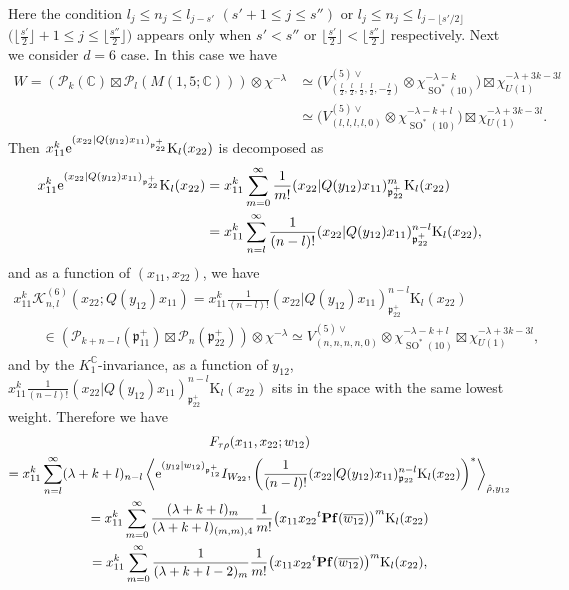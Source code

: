 \documentclass[pdftex]{sigma}
\numberwithin{equation}{section}
\newcommand{\BC}{\mathbb{C}}
\newcommand{\fp}{\mathfrak{p}}
\newcommand{\cK}{\mathcal{K}}
\newcommand{\cP}{\mathcal{P}}
\newcommand{\rK}{\mathrm{K}}
\begin{document}
Here the condition $l_j\le n_j\le l_{j-s'}$ $(s'+1\le j\le s'')$ or $l_j\le n_j\le l_{j-\lfloor s'/2\rfloor}$
$\bigl(\big\lfloor \frac{s'}{2}\big\rfloor+1\le j\le \big\lfloor \frac{s''}{2}\big\rfloor\bigr)$ appears only when
$s'< s''$ or $\big\lfloor \frac{s'}{2}\big\rfloor< \big\lfloor \frac{s''}{2}\big\rfloor$ respectively.
Next we consider $d=6$ case. In this case we have
\begin{align*}
W=(\cP_k(\BC)\boxtimes\cP_l(M(1,5;\BC)))\otimes\chi^{-\lambda}
&\simeq \Big(V_{\left(\frac{l}{2},\frac{l}{2},\frac{l}{2},\frac{l}{2},-\frac{l}{2}\right)}^{(5)\vee}
\otimes\chi_{\operatorname{SO}^*(10)}^{-\lambda-k}\Big)\boxtimes\chi_{U(1)}^{-\lambda+3k-3l} \\
&\simeq \Big(V_{(l,l,l,l,0)}^{(5)\vee}\otimes\chi_{\operatorname{SO}^*(10)}^{-\lambda-k+l}\Big)\boxtimes\chi_{U(1)}^{-\lambda+3k-3l}.
\end{align*}
Then $x_{11}^k{\rm e}^{(x_{22}|Q(y_{12})x_{11})_{\fp^+_{22}}}\rK_l(x_{22})$ is decomposed as
\begin{align*}
x_{11}^k{\rm e}^{(x_{22}|Q(y_{12})x_{11})_{\fp^+_{22}}}\rK_l(x_{22})
&=x_{11}^k\sum_{m=0}^\infty \frac{1}{m!}(x_{22}|Q(y_{12})x_{11})_{\fp^+_{22}}^m\rK_l(x_{22}) \\
&=x_{11}^k\sum_{n=l}^\infty \frac{1}{(n-l)!}(x_{22}|Q(y_{12})x_{11})_{\fp^+_{22}}^{n-l}\rK_l(x_{22}),
\end{align*}
and as a function of $(x_{11},x_{22})$, we have
\begin{gather*}
 x_{11}^k\cK_{n,l}^{(6)}(x_{22};Q(y_{12})x_{11})
=x_{11}^k\frac{1}{(n-l)!}(x_{22}|Q(y_{12})x_{11})_{\fp^+_{22}}^{n-l}\rK_l(x_{22}) \\
\qquad{} \in(\cP_{k+n-l}(\fp^+_{11})\boxtimes\cP_n(\fp^+_{22}))\otimes\chi^{-\lambda}
\simeq V_{(n,n,n,n,0)}^{(5)\vee}\otimes\chi^{-\lambda-k+l}_{\operatorname{SO}^*(10)}\boxtimes\chi_{U(1)}^{-\lambda+3k-3l},
\end{gather*}
and by the $K_1^\BC$-invariance, as a function of $y_{12}$, $x_{11}^k\frac{1}{(n-l)!}(x_{22}|Q(y_{12})x_{11})_{\fp^+_{22}}^{n-l}\rK_l(x_{22})$ sits in the space with the same lowest weight.
Therefore we have
\begin{gather*}
 F_{\tau\rho}(x_{11},x_{22};w_{12})\\
 =x_{11}^k\sum_{n=l}^\infty(\lambda+k+l)_{n-l}\left\langle {\rm e}^{(y_{12}|w_{12})_{\fp^+_{12}}}I_{W_{22}},
\left(\frac{1}{(n-l)!}(x_{22}|Q(y_{12})x_{11})_{\fp_{22}}^{n-l}\rK_l(x_{22})\right)^*\right\rangle_{\hat{\rho},y_{12}} \\
 =x_{11}^k\sum_{m=0}^\infty \frac{(\lambda+k+l)_m}{(\lambda+k+l)_{(m,m),4}}\frac{1}{m!}
\big(x_{11}x_{22}{}^t\mathbf{Pf}(\overline{w_{12}})\big)^m\rK_l(x_{22}) \\
 =x_{11}^k\sum_{m=0}^\infty\frac{1}{(\lambda+k+l-2)_m}\frac{1}{m!}\big(x_{11}x_{22}{}^t\mathbf{Pf}(\overline{w_{12}})\big)^m\rK_l(x_{22}),
\end{gather*}
\end{document}
